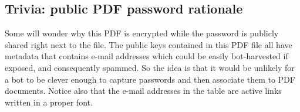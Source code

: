 \documentclass[12pt]{scrartcl}
\begin{document}
\begin{preview}
\section{Trivia: public PDF password rationale}
\begin{multicols}{2}
  Some will wonder why this PDF is encrypted while the password is
  publicly shared right next to the file.  The public keys contained
  in this PDF file all have metadata that contains e-mail addresses
  which could be easily bot-harvested if exposed, and consequently
  spammed.  So the idea is that it would be unlikely for a bot to be
  clever enough to capture passwords and then associate them to PDF
  documents.  Notice also that the e-mail addresses in the table are
  active links written in a proper font.
\end{multicols}

\end{preview}
\end{document}
